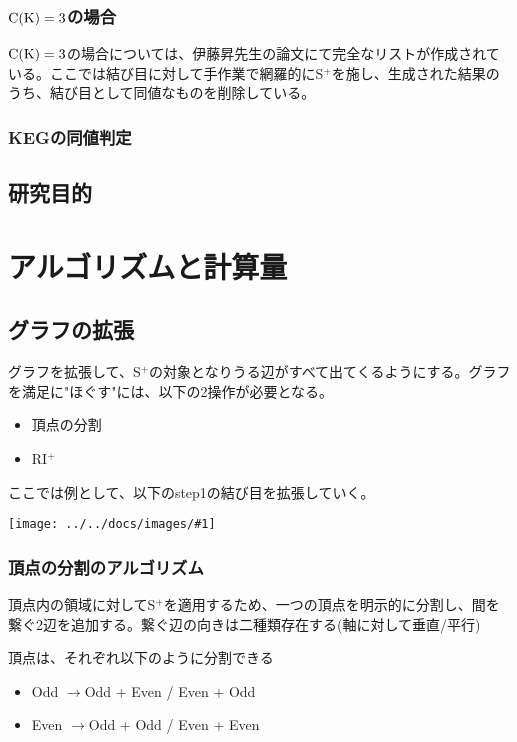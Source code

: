 \documentclass[11pt,a4j]{jarticle}
\newcommand{\splus}{S${}^\text{+}$}
\newcommand{\riplus}{RI${}^\text{+}$}
\newcommand{\fl}[1]{$\rm{#1}$}
\newcommand{\image}[1]{\begin{center}\texttt{[image: ../../docs/images/\#1]}\end{center}}
\newcommand{\ra }{$\rightarrow$}
\begin{document}
\subsubsection{\fl{C(K)=3}の場合}
\fl{C(K)=3}の場合については、伊藤昇先生の論文\cite{ck3}にて完全なリストが作成されている。ここでは結び目に対して手作業で網羅的に\splus を施し、生成された結果のうち、結び目として同値なものを削除している。

\subsubsection{KEGの同値判定}

\subsection{研究目的}

\section{アルゴリズムと計算量}

\subsection{グラフの拡張}
グラフを拡張して、\splus の対象となりうる辺がすべて出てくるようにする。グラフを満足に"ほぐす"には、以下の2操作が必要となる。
\begin{itemize}
    \item 頂点の分割
    \item \riplus
\end{itemize}

ここでは例として、以下のstep1の結び目を拡張していく。
\image{extend_default.jpg}

\subsubsection{頂点の分割のアルゴリズム}
頂点内の領域に対して\splus を適用するため、一つの頂点を明示的に分割し、間を繋ぐ2辺を追加する。繋ぐ辺の向きは二種類存在する(軸に対して垂直/平行)

頂点は、それぞれ以下のように分割できる
\begin{itemize}
    \item Odd \ra  Odd + Even / Even + Odd
    \item Even \ra  Odd + Odd / Even + Even
\end{itemize}
\end{document}
